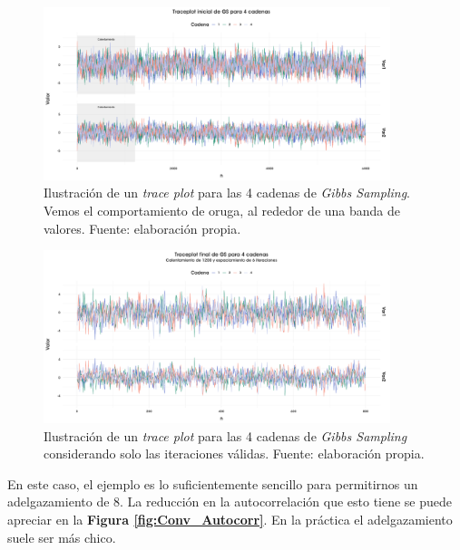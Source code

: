 \begin{figure}[h]
	\centering
	\includegraphics[width=0.9\textwidth]{Figs/Bayes/Ejemplos_Convergencia_Traceplot_Inicial}
	\caption{Ilustración de un \textit{trace plot} para las 4 cadenas de \textit{Gibbs Sampling}. Vemos el comportamiento de oruga, al rededor de una banda de valores. Fuente: elaboración propia.}
	\label{fig:Conv_Trace_Inicial}	
\end{figure}

\begin{figure}[h]
	\centering
	\includegraphics[width=0.9\textwidth]{Figs/Bayes/Ejemplos_Convergencia_Traceplot_Final}
	\caption{Ilustración de un \textit{trace plot} para las 4 cadenas de \textit{Gibbs Sampling} considerando solo las iteraciones válidas. Fuente: elaboración propia.}
	\label{fig:Conv_Trace_Final}	
\end{figure}

En este caso, el ejemplo es lo suficientemente sencillo para permitirnos un adelgazamiento de 8. La reducción en la autocorrelación que esto tiene se puede apreciar en la \textbf{Figura \ref{fig:Conv_Autocorr}}. En la práctica el adelgazamiento suele ser más chico.\\ 

